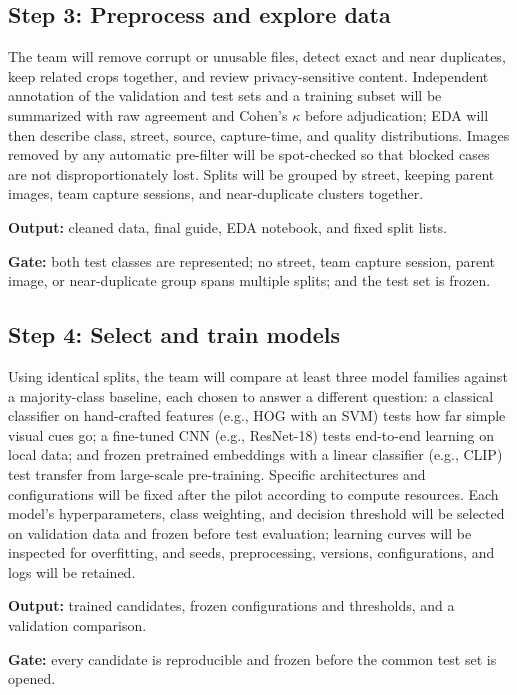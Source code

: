 \subsection{Step 3: Preprocess and explore data}

The team will remove corrupt or unusable files, detect exact and near duplicates, keep related crops together, and review privacy-sensitive content. Independent annotation of the validation and test sets and a training subset will be summarized with raw agreement and Cohen's $\kappa$ before adjudication; EDA will then describe class, street, source, capture-time, and quality distributions. Images removed by any automatic pre-filter will be spot-checked so that blocked cases are not disproportionately lost. Splits will be grouped by street, keeping parent images, team capture sessions, and near-duplicate clusters together.

\textbf{Output:} cleaned data, final guide, EDA notebook, and fixed split lists.

\textbf{Gate:} both test classes are represented; no street, team capture session, parent image, or near-duplicate group spans multiple splits; and the test set is frozen.

\subsection{Step 4: Select and train models}

Using identical splits, the team will compare at least three model families against a majority-class baseline, each chosen to answer a different question: a classical classifier on hand-crafted features (e.g., HOG with an SVM) tests how far simple visual cues go; a fine-tuned CNN (e.g., ResNet-18) tests end-to-end learning on local data; and frozen pretrained embeddings with a linear classifier (e.g., CLIP) test transfer from large-scale pre-training. Specific architectures and configurations will be fixed after the pilot according to compute resources. Each model's hyperparameters, class weighting, and decision threshold will be selected on validation data and frozen before test evaluation; learning curves will be inspected for overfitting, and seeds, preprocessing, versions, configurations, and logs will be retained.

\textbf{Output:} trained candidates, frozen configurations and thresholds, and a validation comparison.

\textbf{Gate:} every candidate is reproducible and frozen before the common test set is opened.

